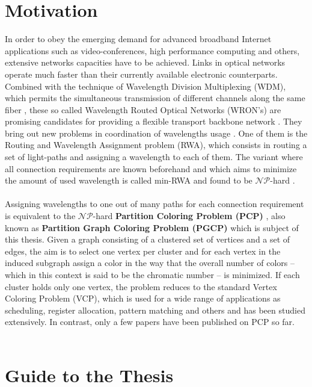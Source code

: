 \section{Motivation}

In order to obey the emerging demand for advanced broadband Internet applications such as video-conferences, high performance computing and others, extensive networks capacities have to be achieved. Links in optical networks operate much faster than their currently available electronic counterparts. Combined with the technique of Wavelength Division Multiplexing (WDM), which permits the simultaneous transmission of different channels along the same fiber \cite{noronha-06}, these so called Wavelength Routed Optical Networks (WRON's) are promising candidates for providing a flexible transport backbone network \cite{krishnaswamy-01}. They bring out new problems in coordination of wavelengths usage \cite{murthy-02}. One of them is the Routing and Wavelength Assignment problem (RWA), which consists in routing a set of light-paths and assigning a wavelength to each of them. The variant where all connection requirements are known beforehand and which aims to minimize the amount of used wavelength is called min-RWA and found to be $\mathcal{NP}$-hard \cite{erlebach-01}.\\\\
Assigning wavelengths to one out of many paths for each connection requirement is equivalent to the $\mathcal{NP}$-hard \textbf{Partition Coloring Problem (PCP)} \cite{li-00}, also known as \textbf{Partition Graph Coloring Problem (PGCP)} which is subject of this thesis. Given a graph consisting of a clustered set of vertices and a set of edges, the aim is to select one vertex per cluster and for each vertex in the induced subgraph assign a color in the way that the overall number of colors -- which in this context is said to be the chromatic number -- is minimized. If each cluster holds only one vertex, the problem reduces to the standard Vertex Coloring Problem (VCP), which is used for a wide range of applications as scheduling, register allocation, pattern matching and others and has been studied extensively. In contrast, only a few papers have been published on PCP so far.\\\\


\section{Guide to the Thesis}

